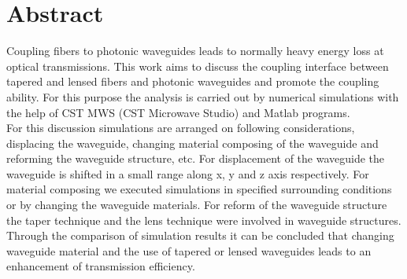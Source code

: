 \chapter*{Abstract}
\label{cha:kurzfassung}
Coupling fibers to photonic waveguides leads to normally heavy energy loss at optical transmissions. This work aims to discuss the coupling interface between tapered and lensed fibers and photonic waveguides and promote the coupling ability. For this purpose the analysis is carried out by numerical simulations with the help of CST MWS (CST Microwave Studio\textregistered) and Matlab programs. \\

For this discussion simulations are arranged on following considerations, displacing the waveguide, changing material composing of the waveguide and reforming the waveguide structure, etc. For displacement of the waveguide the waveguide is shifted in a small range along x, y and z axis respectively. For material composing we executed simulations in specified surrounding conditions or by changing the waveguide materials. For reform of the waveguide structure the taper technique and the lens technique were involved in waveguide structures. \\

Through the comparison of simulation results it can be concluded that changing waveguide material and the use of tapered or lensed waveguides leads to an enhancement of transmission efficiency.
